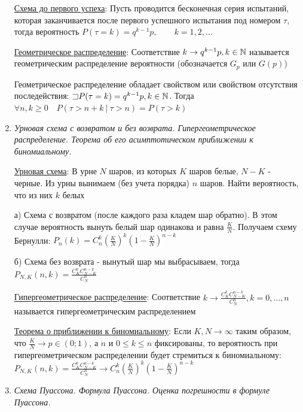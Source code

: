 \documentclass[12pt]{article}
\begin{document}
\begin{enumerate}
    \hyperlink{untilfirstsuccessschema}{Схема до первого успеха}: Пусть проводится бесконечная серия испытаний, которая заканчивается после первого успешного испытания
    под номером $\tau$, тогда вероятность $P(\tau = k) = q^{k - 1} p, \quad\quad k = 1, 2, \dots$

    \hyperlink{geometricdistribution}{Геометрическое распределение}: Соответствие $k \rightarrow q^{k - 1} p, k \in \mathbb{N}$ называется геометрическим
    распределение вероятности (обозначается $G_p$ или $G(p)$)

    Геометрическое распределение обладает свойством  или свойством отсутствия
    последействия: \Ths $\mathord{\sqsupset} P(\tau = k) = q^{k - 1} p, k \in \mathbb{N}$. Тогда $\forall n, k \geq 0 \quad P(\tau > n + k \ | \ \tau > n) = P(\tau > k)$

    \item \textit{Урновая схема с возвратом и без возврата. Гипергеометрическое распределение. Теорема об его асимптотическом приближении к биномиальному.}

    \hyperlink{urnschema}{Урновая схема}: В урне $N$ шаров, из которых $K$ шаров белые, $N - K$ - черные.
    Из урны вынимаем (без учета порядка) $n$ шаров. Найти вероятность, что из них $k$ белых

    а) Схема с возвратом (после каждого раза кладем шар обратно). В этом случае вероятность вынуть белый шар одинакова и
    равна $\frac{K}{N}$. Получаем схему Бернулли: $P_n(k) = C^k_n \left(\frac{K}{N}\right)^k \left(1 - \frac{K}{N}\right)^{n - k}$

    б) Схема без возврата - вынутый шар мы выбрасываем, тогда
    $P_{N, K} (n, k) = \frac{C^k_K C^{n - k}_{N - K}}{C^n_N}$

    \hyperlink{hypergeometricdistribution}{Гипергеометрическое распределение}: Соответствие $k \rightarrow \frac{C^k_K C^{n - k}_{N - K}}{C^n_N}, k = 0, \dots, n$ называется гипергеометрическим
    распределением

    \hyperlink{hypergeometricasimptotic}{Теорема о приближении к биномиальному}: \Ths Если $K, N \to \infty$ таким образом, что $\frac{K}{N} \to p \in (0;1)$, а $n$ и $0 \leq k \leq n$ фиксированы, то
    вероятность при гипергеометрическом распределении будет стремиться к биномиальному:
    $P_{N,K} (n, k) = \frac{C^k_K C^{n - k}_{N - K}}{C^n_N} \rightarrow C^k_n \left(\frac{K}{N}\right)^k \left(1 - \frac{K}{N}\right)^{n - k}$

    \item \textit{Схема Пуассона. Формула Пуассона. Оценка погрешности в формуле Пуассона.}
    

\end{enumerate}
\end{document}
